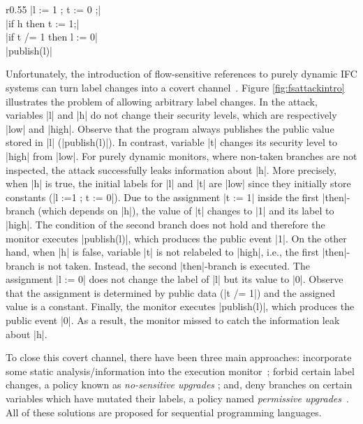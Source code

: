 \begin{wrapfigure}{r}{0.55\columnwidth}
|l := 1 ; t := 0 ;| \\
|if h then t := 1;| \\
|if t /= 1 then l := 0| \\
|publish(l)| 
\caption{\small\label{fig:fsattackintro} Flow-sensitive attack}
\end{wrapfigure}
Unfortunately, the introduction of flow-sensitive references to purely dynamic IFC
systems can turn label changes into a covert channel~\cite{Russo:2010}. 
Figure \ref{fig:fsattackintro} illustrates the problem of allowing arbitrary
label changes.  In the attack, variables |l| and |h| do not change their
security levels, which are respectively |low| and |high|. Observe that the
program always publishes the public value stored in |l| (|publish(l)|). In contrast, variable |t|
changes its security level to |high| from |low|. For purely dynamic monitors, where
non-taken branches are not inspected, the attack successfully leaks information
about |h|. More precisely, when |h| is true, the initial labels for |l| and |t|
are |low| since they initially store constants (|l :=1 ; t := 0|).  Due to 
the assignment |t := 1| inside the
first |then|-branch (which depends on |h|), the value of |t| changes to |1| and its label to
|high|. The condition of the second branch does not hold and therefore 
the monitor executes |publish(l)|, which produces the public event 
|1|. On the other hand, when |h| is false, variable |t| is not relabeled to 
|high|, i.e., the first |then|-branch is not taken. Instead, the second
|then|-branch is executed. 
The assignment |l := 0| does not change the label of |l| but its value to 
 |0|. Observe that the assignment is determined by public data (|t /= 1|)
and the assigned value is a constant. Finally, the monitor executes
|publish(l)|, which produces the public event |0|. As a result, the monitor 
missed to catch the information leak about |h|.  

To close this covert channel, there have been three main approaches:
incorporate some static analysis/information into the execution
monitor~\cite{Russo:2010,stefan:lio,10.1109/SP.2013.10}; forbid certain label
changes, a policy known as \emph{no-sensitive
  upgrades}
; and, deny branches on certain
variables which have mutated their labels, a policy named \emph{permissive
  upgrades}~\cite{Austin:Flanagan:PLAS10}. All of these solutions are proposed
for sequential programming languages.



